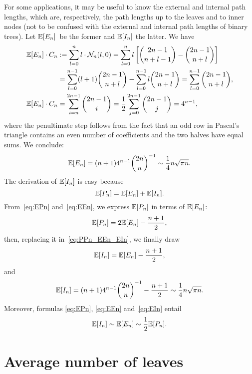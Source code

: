 For some applications, it may be useful to know the external and
internal path lengths, which are, respectively, the path lengths up to
the leaves and to inner nodes (not to be confused with the external
and internal path lengths of binary trees). Let \(\mathbb{E}[{E_n}]\)~be
the former and \(\mathbb{E}[{I_n}]\) the latter. We have
\begin{align*}
\mathbb{E}[{E_n}] \cdot C_n
  &:= \sum_{l=0}^{n} l \cdot \mathcal{N}_n(l,0)
   = \sum_{l=0}^{n}l\left[\binom{2n-1}{n+l-1} -
     \binom{2n-1}{n+l}\right]\\
  &= \sum_{l=0}^{n-1}(l+1)\binom{2n-1}{n+l} -
     \sum_{l=0}^{n-1}l \binom{2n-1}{n+l}
   = \sum_{l=0}^{n-1}\binom{2n-1}{n+l},\\
\mathbb{E}[{E_n}] \cdot C_n
  &= \sum_{i=n}^{2n-1}\binom{2n-1}{i}
   = \frac{1}{2}\sum_{j=0}^{2n-1}\binom{2n-1}{j} = 4^{n-1},
\end{align*}
where the penultimate step follows from the fact that an odd row in
Pascal's triangle contains an even number of coefficients and the two
halves have equal sums. We conclude:
\begin{equation}
\mathbb{E}[{E_n}] = (n+1) 4^{n-1}\binom{2n}{n}^{-1} \sim
\frac{1}{4}n\sqrt{\pi n}.
\label{eq:EEn}
\end{equation}
The derivation of \(\mathbb{E}[{I_n}]\) is easy because
\begin{equation}
\mathbb{E}[{P_n}] = \mathbb{E}[{E_n}] + \mathbb{E}[{I_n}].
\label{eq:PPn_EEn_EIn}
\end{equation}
From~\eqref{eq:EPn} and~\eqref{eq:EEn}, we express \(\mathbb{E}[{P_n}]\)
in terms of \(\mathbb{E}[{E_n}]\):
\begin{equation*}
\mathbb{E}[{P_n}] = 2 \mathbb{E}[{E_n}] - \frac{n+1}{2},
\end{equation*}
then, replacing it in~\eqref{eq:PPn_EEn_EIn}, we finally draw
\begin{equation*}
\mathbb{E}[{I_n}] = \mathbb{E}[{E_n}] - \frac{n+1}{2},
\end{equation*}
and
\begin{equation}
\mathbb{E}[{I_n}]
  = (n+1)4^{n-1}\binom{2n}{n}^{-1} - \frac{n+1}{2} \sim
  \frac{1}{4}n\sqrt{\pi n}.
\label{eq:EIn}
\end{equation}
Moreover, formulas \eqref{eq:EPn}, \eqref{eq:EEn} and~\eqref{eq:EIn}
entail
\begin{equation*}
\mathbb{E}[{I_n}] \sim \mathbb{E}[{E_n}] \sim \frac{1}{2}\mathbb{E}[{P_n}].
\end{equation*}

\section{Average number of leaves}

